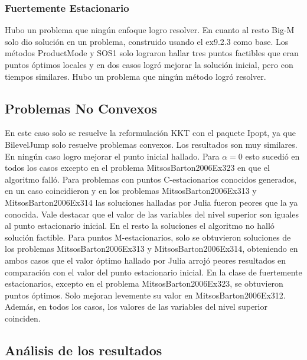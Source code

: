 \subsubsection{Fuertemente Estacionario} 
Hubo un problema que ningún enfoque logro resolver. En cuanto al resto  Big-M solo dio solución en un problema, construido usando el ex9.2.3 como base. Los métodos ProductMode y SOS1 solo lograron hallar tres puntos factibles que eran puntos óptimos locales y en dos casos logró mejorar la solución inicial, pero con tiempos similares. Hubo un problema que ningún método logró resolver.


\subsection{Problemas No Convexos}

En este caso solo se resuelve  la reformulación KKT con el paquete Ipopt, ya que BilevelJump solo resuelve problemas convexos. 
Los resultados son muy similares. 
En ningún caso logro mejorar el punto inicial hallado. 
Para $\alpha =0$ esto sucedió en todos los casos excepto en el problema MitsosBarton2006Ex323 en que el algoritmo falló. 
Para  problemas con puntos C-estacionarios conocidos generados,  
en un caso coincidieron y en  los problemas MitsosBarton2006Ex313 y MitsosBarton2006Ex314 
las soluciones halladas por Julia fueron peores que la ya conocida. Vale destacar que el 
valor de las variables del nivel superior son iguales al punto estacionario inicial. 
En el resto la soluciones el algoritmo no halló solución factible.   
Para puntos M-estacionarios, solo se obtuvieron soluciones de los problemas MitsosBarton2006Ex313 y 
MitsosBarton2006Ex314, obteniendo en ambos casos que el valor óptimo hallado por Julia arrojó  peores resultados 
 en comparación con el valor del punto estacionario inicial. En la clase de fuertemente estacionarios, 
excepto en el problema MitsosBarton2006Ex323,
 se obtuvieron puntos óptimos. Solo mejoran levemente su valor en MitsosBarton2006Ex312. 
 Además, en todos los casos, los valores de las variables del nivel superior coinciden.
     

    




  


\subsection{Análisis de los resultados}


